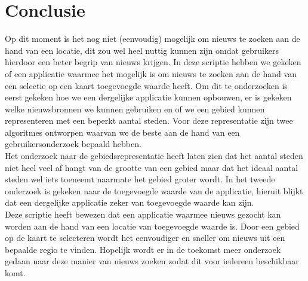 \documentclass[twoside,openright]{uva-bachelor-thesis}
\begin{document}
\chapter{Conclusie}
	Op dit moment is het nog niet (eenvoudig) mogelijk om nieuws te zoeken aan de hand van een locatie, dit zou wel heel nuttig kunnen zijn omdat gebruikers hierdoor een beter begrip van nieuws krijgen. In deze scriptie hebben we gekeken of een applicatie waarmee het mogelijk is om nieuws te zoeken aan de hand van een selectie op een kaart toegevoegde waarde heeft. Om dit te onderzoeken is eerst gekeken hoe we een dergelijke applicatie kunnen opbouwen, er is gekeken welke nieuwsbronnen we kunnen gebruiken en of we een gebied kunnen representeren met een beperkt aantal steden. Voor deze representatie zijn twee algoritmes ontworpen waarvan we de beste aan de hand van een gebruikersonderzoek bepaald hebben.
	\\[0.5cm]
	Het onderzoek naar de gebiedsrepresentatie heeft laten zien dat het aantal steden niet heel veel af hangt van de grootte van een gebied maar dat het ideaal aantal steden wel iets toeneemt naarmate het gebied groter wordt. In het tweede onderzoek is gekeken naar de toegevoegde waarde van de applicatie, hieruit blijkt dat een dergelijke applicatie zeker van toegevoegde waarde kan zijn.
	\\[0.5cm]
	Deze scriptie heeft bewezen dat een applicatie waarmee nieuws gezocht kan worden aan de hand van een locatie van toegevoegde waarde is. Door een gebied op de kaart te selecteren wordt het eenvoudiger en sneller om nieuws uit een bepaalde regio te vinden. Hopelijk wordt er in de toekomst meer onderzoek gedaan naar deze manier van nieuws zoeken zodat dit voor iedereen beschikbaar komt.
	
\end{document}
